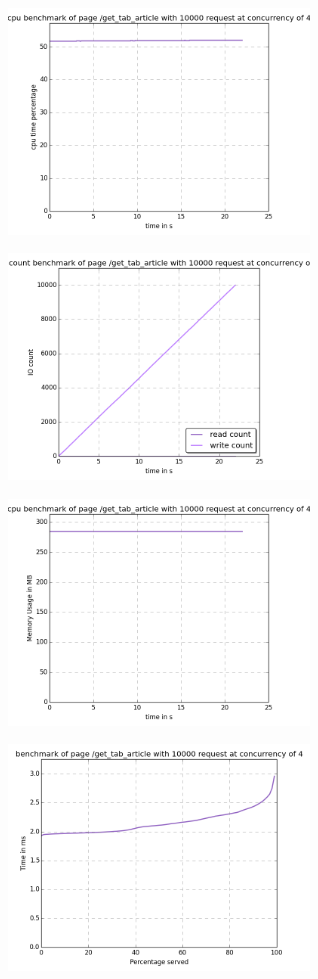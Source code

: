 \begin{center}
\includegraphics[width=0.6\textwidth]{img/get_tab_article.cpu.png}



\includegraphics[width=0.6\textwidth]{img/get_tab_article.io-count.png}



\includegraphics[width=0.6\textwidth]{img/get_tab_article.mem.png}



\includegraphics[width=0.6\textwidth]{img/get_tab_article.serv-time.png}




\end{center}
